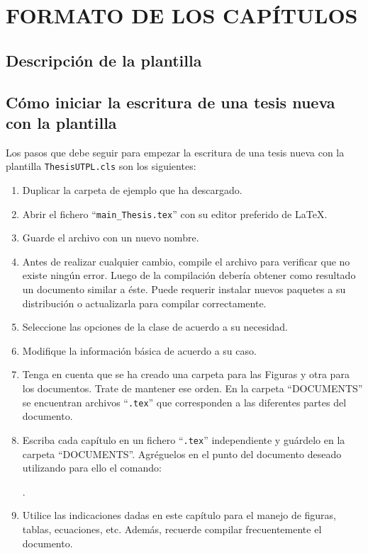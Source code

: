%

\chapter{FORMATO DE LOS CAPÍTULOS}

\section{Descripción de la plantilla}




\section{Cómo iniciar la escritura de una tesis nueva con la plantilla}
Los pasos que debe seguir para empezar la escritura de una tesis nueva con la plantilla \texttt{ThesisUTPL.cls} son los siguientes: 

\begin{enumerate}
	\item Duplicar la carpeta de ejemplo que ha descargado. 
	\item Abrir el fichero ``\lstinline|main_Thesis.tex|'' con su editor preferido de \LaTeX.
	\item Guarde el archivo con un nuevo nombre. 
	\item Antes de realizar cualquier cambio, compile el archivo para verificar que no existe ningún error. Luego de la compilación debería obtener como resultado un documento similar a éste. Puede requerir instalar nuevos paquetes a su distribución o actualizarla para compilar correctamente. 
	\item Seleccione las opciones de la clase de acuerdo a su necesidad. 
	\item Modifique la información básica de acuerdo a su caso. 
	\item Tenga en cuenta que se ha creado una carpeta para las Figuras y otra para los documentos. Trate de mantener ese orden. En la carpeta ``DOCUMENTS'' se encuentran archivos ``\texttt{.tex}'' que corresponden a las diferentes partes del documento. 
	\item Escriba cada capítulo en un fichero ``\texttt{.tex}'' independiente y guárdelo en la carpeta ``DOCUMENTS''. Agréguelos en el punto del documento deseado utilizando para ello el comando:
	\begin{center}
		\lstinline||.
	\end{center}
	\item Utilice las indicaciones dadas en este capítulo para el manejo de figuras, tablas, ecuaciones, etc. Además, recuerde compilar frecuentemente el documento. 
\end{enumerate}

